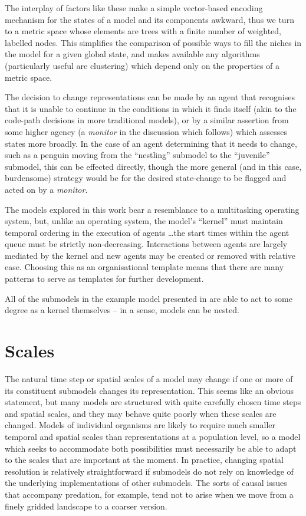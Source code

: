 The interplay of factors like these make a simple vector-based
encoding mechanism for the states of a model and its components
awkward, thus we turn to a metric space whose elements are trees with
a finite number of weighted, labelled nodes. This simplifies the
comparison of possible ways to fill the niches in the model for a
given global state, and makes available any algorithms (particularly
useful are clustering) which depend only on the properties of a metric
space.

The decision to change representations can be made by an agent that
recognises that it is unable to continue in the conditions in which it
finds itself (akin to the code-path decisions in more traditional
models), or by a similar assertion from some higher agency
(a \emph{monitor\/} in the discussion which follows) which assesses
states more broadly.  In the case of an agent determining that it
needs to change, such as a penguin moving from the ``nestling''
submodel to the ``juvenile'' submodel, this can be effected directly,
though the more general (and in this case, burdensome) strategy would
be for the desired state-change to be flagged and acted on by
a \emph{monitor\/}.

The models explored in this work bear a resemblance to a multitasking
operating system, but, unlike an operating system, the model's ``kernel''
must maintain temporal ordering in the execution of agents \ldots the
start times within the agent queue must be strictly non-decreasing.
Interactions between agents are largely mediated by the kernel and
new agents may be created or removed with relative ease.  Choosing
this as an organisational template means that there are many patterns
to serve as templates for further development.

All of the submodels in the example model presented in \Cfive are able
to act to some degree as a kernel themselves -- in a sense, models can
be nested.

\section{Scales}
The natural time step or spatial scales of a model may change if one
or more of its constituent submodels changes its representation.
This seems like an obvious statement, but many models are structured
with quite carefully chosen time steps and spatial scales, and they
may behave quite poorly when these scales are changed.  Models of
individual organisms are likely to require much smaller temporal and
spatial scales than representations at a population level, so a model
which seeks to accommodate both possibilities must necessarily be able
to adapt to the scales that are important at the moment.  In practice,
changing spatial resolution is relatively straightforward if submodels
do not rely on knowledge of the underlying implementations of other
submodels.  The sorts of causal issues that accompany predation, for
example, tend not to arise when we move from a finely gridded
landscape to a coarser version.

